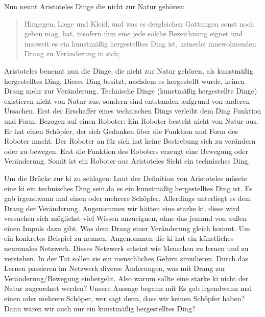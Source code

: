 Nun nennt Aristoteles Dinge die nicht zur Natur gehören:
\begin{quote}
	\glqq Hingegen, Liege und Kleid, und was es dergleichen Gattungen sonst noch geben mag, hat, insofern ihm eine jede solche Bezeichnung eignet und insoweit es ein kunstmäßig hergestelltes Ding ist, keinerlei innewohnenden Drang zu Veränderung in sich; \grqq{}
	\cite[192b8 ff.]{PhysikII} 
\end{quote}
Aristoteles benennt nun die Dinge, die nicht zur Natur gehören, als kunstmäßig hergestelltes Ding. Dieses Ding besitzt, nachdem es hergestellt wurde, keinen Drang mehr zur Veränderung. Technische Dinge (kunstmäßig hergestellte Dinge) existieren nicht von Natur aus, sondern sind entstanden aufgrund von anderen Ursachen. Erst der Erschaffer eines technischen Dings verleiht dem Ding Funktion und Form. Bezogen auf einen Roboter: Ein Roboter besteht nicht von Natur aus. Er hat einen Schöpfer, der sich Gedanken über die Funktion und Form des Roboter macht. Der Roboter an für sich hat keine Bestrebung sich zu verändern oder zu bewegen. Erst die Funktion des Roboters erzeugt eine Bewegung oder Veränderung. Somit ist ein Roboter aus Aristoteles Sicht ein technisches Ding. 

Um die Brücke zur \ac{ki} zu schlagen: Laut der Definition von Aristoteles müsste eine \ac{ki} ein technisches Ding sein,da es ein kunstmäßig hergestelltes Ding ist. Es gab irgendwann mal einen oder mehrere Schöpfer. Allerdings unterliegt es dem Drang der Veränderung. Angenommen wir hätten eine starke \ac{ki}, diese wird versuchen sich möglichst viel Wissen anzueignen, ohne das jemand von außen einen Impuls dazu gibt. Was dem Drang einer Veränderung gleich kommt. Um ein konkretes Beispiel zu nennen. Angenommen die \ac{ki} hat ein künstliches neuronales Netzwerk. Dieses Netzwerk scheint wie Menschen zu lernen und zu verstehen. In der Tat sollen sie ein menschliches Gehirn simulieren. Durch das \glqq Lernen\grqq{} passieren im Netzwerk diverse Änderungen, was mit Drang zur Veränderung/Bewegung einhergeht. Also warum sollte eine starke \ac{ki} nicht der Natur zugeordnet werden? Unsere Aussage begann mit \glqq Es gab irgendwann mal einen oder mehrere Schöper\grqq{}, wer sagt denn, dass wir keinen Schöpfer haben? Dann wären wir auch nur ein kunstmäßig hergestelltes Ding?


